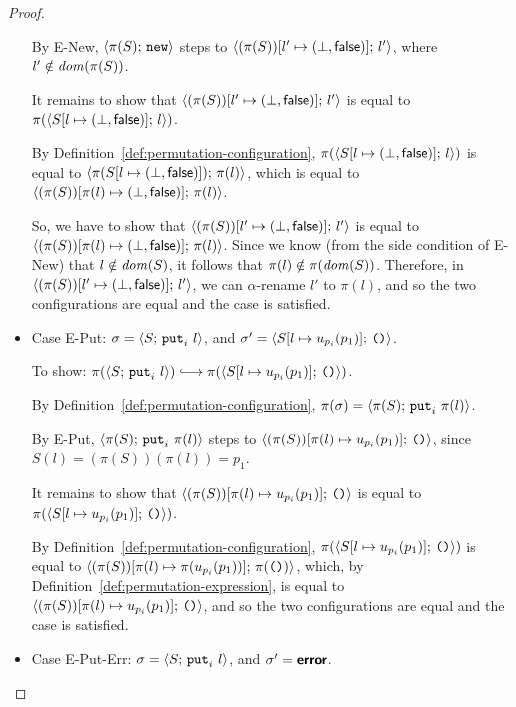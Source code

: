 \begin{proof}
\begin{itemize}
      By {\sc E-New}, $\langle \pi(S);\, \mbox{\texttt{new}} \rangle$ steps to
      $\langle (\pi(S))[l' \mapsto (\bot, \textsf{false})];\, l' \rangle$, where
      $l' \notin \mathit{dom}(\pi(S))$.
      
      It remains to show that
      $\langle (\pi(S))[l' \mapsto (\bot, \textsf{false})];\, l' \rangle$ is equal
      to $\pi(\langle S[l \mapsto (\bot, \textsf{false})];\, l \rangle)$.

      By Definition~\ref{def:permutation-configuration},
      $\pi(\langle S[l \mapsto (\bot, \textsf{false})];\, l \rangle)$ is equal to
      $\langle \pi(S[l \mapsto (\bot, \textsf{false})]);\, \pi(l) \rangle$, which
      is equal to
      $\langle (\pi(S))[\pi(l) \mapsto (\bot, \textsf{false})];\, \pi(l) \rangle$.

      So, we have to show that
      $\langle (\pi(S))[l' \mapsto (\bot, \textsf{false})];\, l' \rangle$ is equal
      to
      $\langle (\pi(S))[\pi(l) \mapsto (\bot, \textsf{false})];\, \pi(l) \rangle$.
      Since we know (from the side condition of {\sc E-New}) that $l
      \notin \mathit{dom}(S)$, it follows that $\pi(l) \notin \pi(\mathit{dom}(S))$.
      Therefore, in
      $\langle (\pi(S))[l' \mapsto (\bot, \textsf{false})];\, l' \rangle$, we can
      $\alpha$-rename $l'$ to $\pi(l)$, and so the two configurations
      are equal and the case is satisfied.

    \item Case {\sc E-Put}: $\sigma = \langle S;\, \mbox{\texttt{put}}_i~l \rangle$, and
      $\sigma' = \langle S[l \mapsto u_{p_i}(p_1)];\, \mbox{\texttt{()}} \rangle$.

      To show: $\pi(\config{S}{\putiexp{l}}) \parstepsto
      \pi(\config{\extSRaw{S}{l}{u_{p_i}(p_1)}}{\unit})$.

      By Definition~\ref{def:permutation-configuration}, $\pi(\sigma) =
      \langle \pi(S);\, \mbox{\texttt{put}}_i~\pi(l) \rangle$.

      By {\sc E-Put}, $\langle \pi(S);\, \mbox{\texttt{put}}_i~\pi(l) \rangle$ steps to
      $\langle (\pi(S))[\pi(l) \mapsto u_{p_i}(p_1)];\, \mbox{\texttt{()}} \rangle$,
      since $S(l) = (\pi(S))(\pi(l)) = p_1$.

      It remains to show that
      $\langle (\pi(S))[\pi(l) \mapsto u_{p_i}(p_1)];\, \mbox{\texttt{()}} \rangle$ is
      equal to $\pi(\langle S[l \mapsto u_{p_i}(p_1)];\, \mbox{\texttt{()}} \rangle)$.

      By Definition~\ref{def:permutation-configuration},
      $\pi(\langle S[l \mapsto u_{p_i}(p_1)];\, \mbox{\texttt{()}} \rangle)$ is equal to
      $\langle (\pi(S))[\pi(l) \mapsto \pi(u_{p_i}(p_1))];\, \pi(\mbox{\texttt{()}}) \rangle$,
      which, by Definition~\ref{def:permutation-expression}, is equal
      to $\langle (\pi(S))[\pi(l) \mapsto u_{p_i}(p_1)];\, \mbox{\texttt{()}} \rangle$,
      and so the two configurations are equal and the case is
      satisfied.
    \item Case {\sc E-Put-Err}: $\sigma = \langle S;\, \mbox{\texttt{put}}_i~l \rangle$,
      and $\sigma' = \textbf{\textsf{error}}$.


\end{itemize}
\end{proof}
